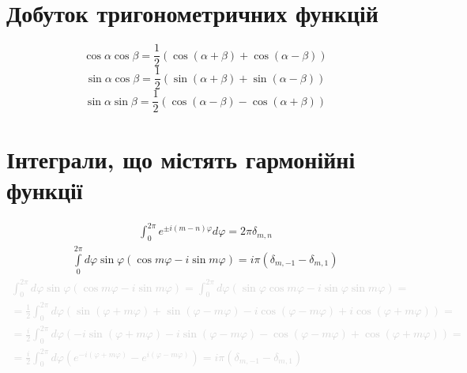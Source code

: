 \section{Добуток тригонометричних функцій}
%
\begin{equation}
\cos \alpha \cos \beta = \frac{1}{2} 
\left(  \cos (\alpha + \beta) + \cos (\alpha - \beta) \right)
\end{equation}
%
\begin{equation}
\sin \alpha \cos \beta = \frac{1}{2} 
\left( \sin (\alpha + \beta) + \sin (\alpha - \beta) \right)
\end{equation}
%
\begin{equation}
\sin \alpha \sin \beta = \frac{1}{2} 
\left( \cos (\alpha - \beta) - \cos (\alpha + \beta) \right)
\end{equation}
%
\section{Інтеграли, що містять гармонійні функції}
%
\begin{equation} \begin{aligned} \label{eq:int_exp0}
\int_{0}^{2\pi} e^{\pm i (m-n) \varphi} d \varphi = 2 \pi \delta_{m,n} 
\end{aligned} \end{equation}
%
\begin{equation} \begin{aligned} \label{eq:int_exp1}
\int \limits_{0}^{2\pi} d \varphi \sin \varphi 
\left( \cos m \varphi - i \sin m \varphi \right) = 
i \pi \left( \delta_{m,-1} - \delta_{m,1} \right)
\end{aligned} \end{equation}
%
\textcolor{lightgray}{ \begin{equation*} \begin{aligned}
\int_{0}^{2\pi} d \varphi \sin \varphi 
\left( \cos m \varphi - i \sin m \varphi \right) = \int_{0}^{2\pi} d \varphi
\left( \sin \varphi \cos m \varphi - i \sin \varphi \sin m \varphi \right) = \\
= \frac{1}{2} \int_{0}^{2\pi} d \varphi \left( \sin (\varphi + m \varphi) + 
\sin (\varphi - m \varphi) - i \cos (\varphi - m \varphi) + 
i \cos (\varphi + m \varphi) \right) = \\
= \frac{i}{2} \int_{0}^{2\pi} d \varphi \left( -i \sin (\varphi + m \varphi) -
i \sin (\varphi - m \varphi) - \cos (\varphi - m \varphi) + 
\cos (\varphi + m \varphi) \right) = \\
= \frac{i}{2} \int_{0}^{2\pi} d \varphi \left( e^{-i (\varphi + m \varphi)} - 
e^{i (\varphi - m \varphi)} \right) = 
i \pi \left( \delta_{m,-1} - \delta_{m,1} \right)
\end{aligned} \end{equation*} }
